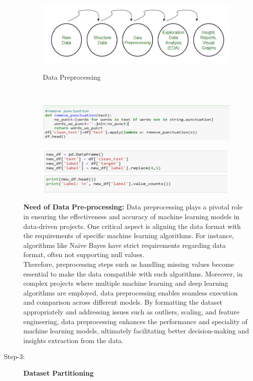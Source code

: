 \begin{description}
\\
\begin{figure}[hbt!]
  \centering
  \includegraphics[width=0.8\linewidth]{C_chap/fig26.png}
\\\caption{Data Preprocessing}
\end{figure}
\\

 \begin{figure}[hbt!]
  \centering
 \includegraphics[width=0.8\linewidth]{C_chap/fig14.png}
\end{figure}
 \begin{figure}[hbt!]
  \centering
 \includegraphics[width=0.8\linewidth]{C_chap/fig15.png}
\end{figure}
\textbf{Need of Data Pre-processing: } 
Data preprocessing plays a pivotal role in ensuring the effectiveness and accuracy of machine learning models in data-driven projects. One critical aspect is aligning the data format with the requirements of specific machine learning algorithms. For instance, algorithms like Naive Bayes have strict requirements regarding data format, often not supporting null values. 
\\
Therefore, preprocessing steps such as handling missing values become essential to make the data compatible with such algorithms. Moreover, in complex projects where multiple machine learning and deep learning algorithms are employed, data preprocessing enables seamless execution and comparison across different models. By formatting the dataset appropriately and addressing issues such as outliers, scaling, and feature engineering, data preprocessing enhances the performance and speciality of machine learning models, ultimately facilitating better decision-making and insights extraction from the data.
\item[Step-3:] \textbf{Dataset Partitioning}


\end{description}
